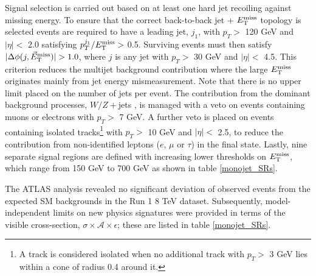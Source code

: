 Signal selection is carried out based on at least one hard jet recoiling against missing energy. To ensure that the correct back-to-back jet + $E_{\mathrm{T}}^{\mathrm{miss}}$ topology is selected events are required to have a leading jet, $j_{1}$, with $p_{T} >$ 120 GeV and $|\eta| <$ 2.0 satisfying $p_{T}^{j_{1}}/E_{\mathrm{T}}^{\mathrm{miss}} >$ 0.5. Surviving events must then satisfy $|\Delta\phi(j,\metvec)|>1.0$, where $j$ is any jet with $p_{T} >$ 30 GeV and $|\eta| <$ 4.5. This criterion reduces the multijet background contribution where the large $E_{\mathrm{T}}^{\mathrm{miss}}$ originates mainly from jet energy mismeasurement. Note that there is no upper limit placed on the number of jets per event. The contribution from the dominant background processes, $W/Z+$jets
, is managed with a veto on events containing muons or electrons with $p_{T}>$ 7 GeV. A further veto is placed on events containing isolated tracks\footnote{A track is considered isolated when no additional track with $p_{T} >$ 3 GeV lies within a cone of radius 0.4 around it.} with $p_{T}>$ 10 GeV and $|\eta| <$ 2.5, to reduce the contribution from non-identified leptons ($e$, $\mu$ or $\tau$) in the final state. Lastly, nine separate signal regions are defined with increasing lower thresholds on $E_{\mathrm{T}}^{\mathrm{miss}}$, which range from 150 GeV to 700 GeV as shown in table \ref{monojet_SRs}.

The ATLAS \monojet analysis revealed no significant deviation of observed events from the expected SM backgrounds in the Run 1 8 TeV dataset. Subsequently, model-independent limits on new physics signatures were provided in terms of the visible cross-section, $\sigma\times\mathcal{A}\times\epsilon$; these are listed in table \ref{monojet_SRs}.

